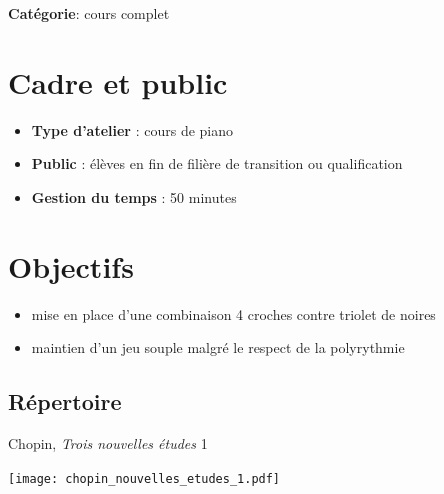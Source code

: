 \documentclass[a4paper,11pt,bibliography=totoc,numbers=noenddot,listof=flat,DIV=11,BCOR=0mm]{scrreprt}%
\begin{document}

{\large \textbf{Catégorie}}:
cours complet

\section*{Cadre et public}
\begin{itemize}
\item [\textbullet]\textbf{Type d'atelier} : cours de piano

\item [\textbullet]\textbf{Public} : élèves en fin de filière de transition ou qualification

\item [\textbullet]\textbf{Gestion du temps} : 50 minutes

\end{itemize}

\section*{Objectifs}
\begin{itemize}
\item mise en place d'une combinaison 4 croches contre triolet de noires
\item maintien d'un jeu souple malgré le respect de la polyrythmie
\end{itemize}

\subsection*{Répertoire}
Chopin, \emph{Trois nouvelles études} \no{}1

%
\begin{center}\texttt{[image: chopin\_nouvelles\_etudes\_1.pdf]}\end{center}

\end{document}
